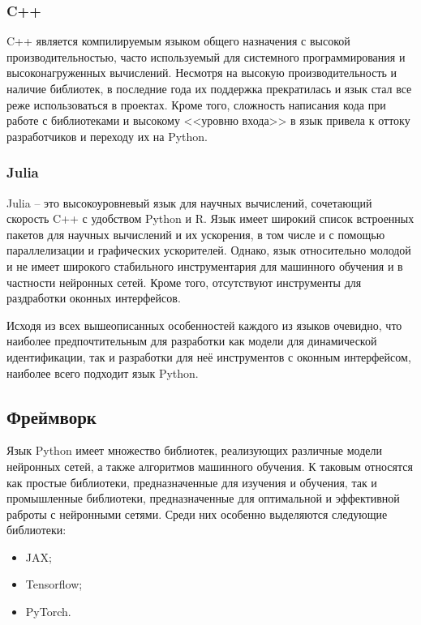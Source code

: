 \subsubsection{C++} 
C++ является компилируемым языком общего назначения с высокой производительностью,
часто используемый для системного программирования и высоконагруженных
вычислений. Несмотря на высокую производительность и наличие библиотек, в
последние года их поддержка прекратилась и язык стал все реже использоваться в
проектах. Кроме того, сложность написания кода при работе с библиотеками и
высокому <<уровню входа>> в язык привела к оттоку разработчиков и переходу их
на Python.

\subsubsection{Julia} 
Julia – это высокоуровневый язык для научных вычислений, сочетающий скорость C++ с удобством Python и R. Язык имеет широкий список встроенных пакетов для научных вычислений и их ускорения, в том числе и с помощью параллелизации и графических ускорителей. Однако, язык относительно молодой и не имеет широкого стабильного инструментария для машинного обучения и в частности нейронных сетей. Кроме того, отсутствуют инструменты для раздработки оконных интерфейсов. 

Исходя из всех вышеописанных особенностей каждого из языков очевидно, что наиболее предпочтительным для разработки как модели для динамической идентификации, так и разработки для неё инструментов с оконным интерфейсом, наиболее всего подходит язык Python.

\subsection{Фреймворк}

Язык Python имеет множество библиотек, реализующих различные модели нейронных
сетей, а также алгоритмов машинного обучения. К таковым относятся как простые
библиотеки, предназначенные для изучения и обучения, так и промышленные
библиотеки, предназначенные для оптимальной и эффективной раброты с нейронными
сетями. Среди них особенно выделяются следующие библиотеки:

\begin{itemize}
  \item JAX;
  \item Tensorflow;
  \item PyTorch. 
\end{itemize}

